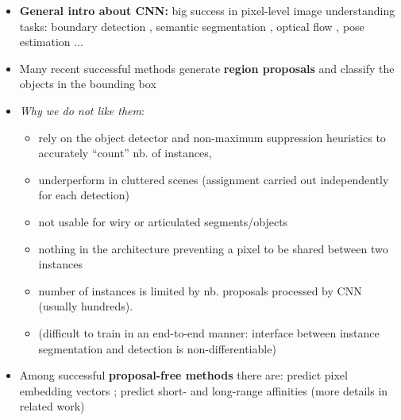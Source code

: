 \begin{itemize}
\item \textbf{General intro about CNN:} big success in pixel-level image understanding tasks: boundary detection \cite{arbelaez2011contour,xie2015holistically,maninis2018convolutional}, semantic segmentation \cite{long2015fully,chen2018deeplab,kong2018recurrent}, optical flow \cite{weinzaepfel2013deepflow,dosovitskiy2015flownet}, pose estimation \cite{wei2016convolutional,cao2017realtime}...
\item Many recent successful methods generate \textbf{region proposals} and classify the objects in the bounding box \cite{yang2012layered,ladicky2010and,hariharan2014simultaneous,chen2015multi,dai2016instance,liang2016reversible,he2017mask}
\item \emph{Why we do not like them}:
\begin{itemize}
\item rely on the object detector and non-maximum suppression heuristics to accurately “count” nb. of instances, 
\item underperform in cluttered scenes (assignment carried out independently for each detection) 
\item not usable for wiry or articulated segments/objects 
\item nothing in the architecture preventing a pixel to be shared between two instances
\item number of instances is limited by nb. proposals processed by CNN (usually hundreds). 
\item (difficult to train in an end-to-end manner: interface between instance segmentation and detection is non-differentiable)
\end{itemize}

\item Among successful \textbf{proposal-free methods} there are: predict pixel embedding vectors \cite{kong2018recurrent,fathi2017semantic,newell2017associative,de2017semantic}; predict short- and long-range affinities \cite{liu2018affinity,wolf2018mutex,xie2015holistically} (more details in related work)


\end{itemize}
